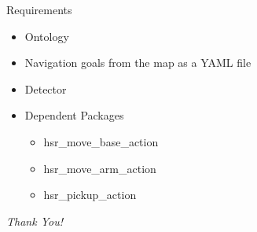 \documentclass[aspectratio=169]{beamer}
\begin{document}
\begin{frame}{Requirements}
    \begin{itemize}
        \item Ontology
        \item Navigation goals from the map as a YAML file
        \item Detector
        \item Dependent Packages
              \begin{itemize}
          \item hsr\_move\_base\_action
          \item hsr\_move\_arm\_action
          \item hsr\_pickup\_action
      \end{itemize}
    \end{itemize}
\end{frame}


\begin{frame}{}
  \centering \Huge
  \emph{Thank You!}
\end{frame}
\end{document}

